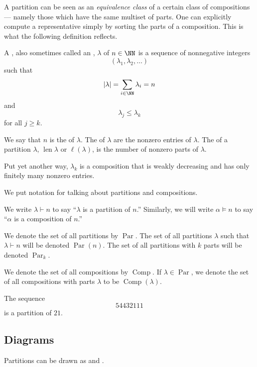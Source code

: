 \documentclass{article}
\DeclareMathOperator{\len}{len}
\DeclareMathOperator{\Par}{Par}
\DeclareMathOperator{\Com}{Comp}
\begin{document}
A partition can be seen as an \textit{equivalence class} of a certain class of compositions--- namely those which have the same multiset of parts.
One can explicitly compute a representative simply by sorting the parts of a composition.
This is what the following definition reflects.

\begin{definition}
    A , also sometimes called an , $\lambda$ of $n \in \NN$ is a sequence of nonnegative integers 
    \[
        (\lambda_1,\lambda_2,\ldots)
    \]
    such that 
    \[
        |\lambda| = \sum_{i\in\NN}\lambda_i = n
    \]
    and 
    \[
        \lambda_j \leq \lambda_k
    \]
    for all $j\geq k$.

    We say that $n$ is the  of $\lambda$.
    The  of $\lambda$ are the nonzero entries of $\lambda$.
    The  of a partition $\lambda$, $\len \lambda$ or $\ell(\lambda)$, is the number of nonzero parts of $\lambda$.
\end{definition}

Put yet another way, $\lambda_k$ is a composition that is weakly decreasing and has only finitely many nonzero entries.

We put notation for talking about partitions and compositions.

\begin{convention}
    We write $\lambda \vdash n$ to say ``$\lambda$ is a partition of $n$.''
    Similarly, we will write $\alpha \models n$ to say ``$\alpha$ is a composition of $n$.''

    We denote the set of all partitions by $\Par$.
    The set of all partitions $\lambda$ such that $\lambda \vdash n$ will be denoted $\Par(n)$.
    The set of all partitions with $k$ parts will be denoted $\Par_k$.

    We denote the set of all compositions by $\Com$.
    If $\lambda \in \Par$, we denote the set of all compositions with parts $\lambda$ to be $\Com(\lambda)$.

\end{convention}


\begin{example}
    The sequence
    \[
        54432111
    \]
    is a partition of $21$.
\end{example}


\subsection{Diagrams}
Partitions can be drawn as  and . 
\end{document}
